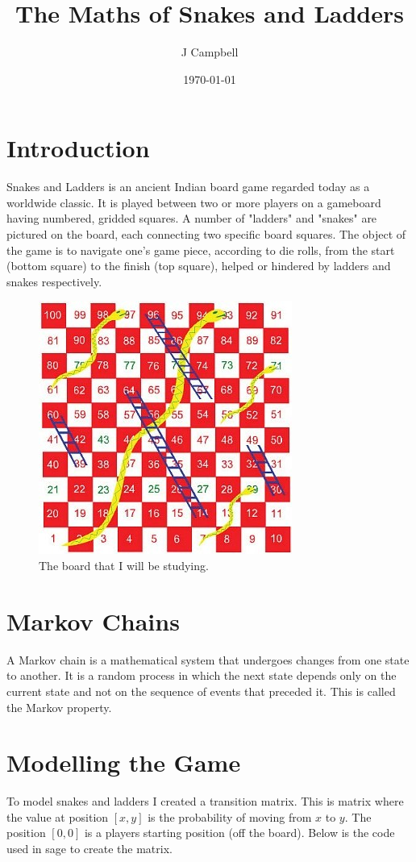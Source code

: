\documentclass[a4paper]{article}
\title{The Maths of Snakes and Ladders}
\author{J Campbell}
\date{\today}
\begin{document}
\maketitle
\section{Introduction}
Snakes and Ladders is an ancient Indian board game regarded today as a worldwide classic. It is played between two or more players on a gameboard having numbered, gridded squares. A number of "ladders" and "snakes" are pictured on the board, each connecting two specific board squares. The object of the game is to navigate one's game piece, according to die rolls, from the start (bottom square) to the finish (top square), helped or hindered by ladders and snakes respectively.\cite{wiki:ButterflyEffect}

\begin{figure}[!htbp]
\begin{center}
\includegraphics[scale=2.5]{images/SALboard}
\end{center}
\caption{The board that I will be studying.}
\end{figure}

\section{Markov Chains}
A Markov chain is a mathematical system that undergoes changes from one state to another. It is a random process in which the next state depends only on the current state and not on the sequence of events that preceded it. This is called the Markov property.

\section{Modelling the Game}
To model snakes and ladders I created a transition matrix. This is matrix where the value at position $[x,y]$ is the probability of moving from $x$ to $y$. The position $[0,0]$ is a players starting position (off the board). Below is the code used in sage to create the matrix.
\end{document}
